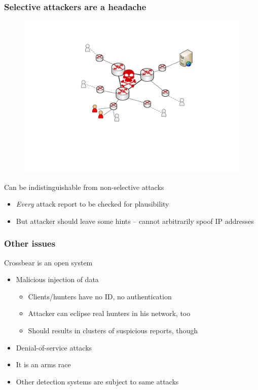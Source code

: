 \begin{frame}
\frametitle{Selective attackers are a headache}
  \begin{figure}[t]
    \centering
    \includegraphics[scale=.3]{figures/scenario4-core-selective.pdf}
  \end{figure}
\begin{block}{Can be indistinguishable from non-selective attacks}
  \begin{itemize}
    \item \textit{Every} attack report to be checked for plausibility
    \item But attacker should leave some hints -- cannot arbitrarily spoof IP addresses
  \end{itemize}
\end{block}
\end{frame}



\begin{frame}
\frametitle{Other issues}
\begin{block}{Crossbear is an open system}
\begin{itemize}
  \item Malicious injection of data
    \begin{itemize}
      \item Clients/hunters have no ID, no authentication
      \item Attacker can eclipse real hunters in his network, too
      \item Should results in clusters of suspicious reports, though
    \end{itemize}
  \item Denial-of-service attacks
  \item It is an arms race
  \item Other detection systems are subject to same attacks
\end{itemize}
\end{block}
\end{frame}

